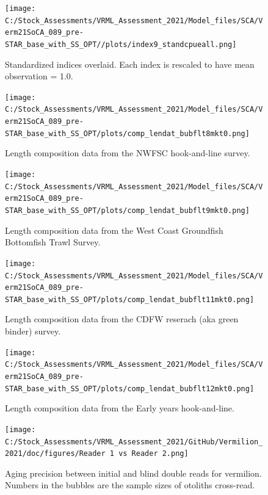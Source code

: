 \documentclass[11pt,
  english,
  a4paper,
]{article}
\begin{document}
\begin{figure}
\centering
\texttt{[image: C:/Stock\_Assessments/VRML\_Assessment\_2021/Model\_files/SCA/Verm21SoCA\_089\_pre-STAR\_base\_with\_SS\_OPT//plots/index9\_standcpueall.png]}
\caption{Standardized indices overlaid. Each index is rescaled to have mean observation = 1.0.\label{fig:cpueall}}
\end{figure}

\begin{figure}
\centering
\texttt{[image: C:/Stock\_Assessments/VRML\_Assessment\_2021/Model\_files/SCA/Verm21SoCA\_089\_pre-STAR\_base\_with\_SS\_OPT/plots/comp\_lendat\_bubflt8mkt0.png]}
\caption{Length composition data from the NWFSC hook-and-line survey.\label{fig:len-data-NWFSC-HKL}}
\end{figure}

\begin{figure}
\centering
\texttt{[image: C:/Stock\_Assessments/VRML\_Assessment\_2021/Model\_files/SCA/Verm21SoCA\_089\_pre-STAR\_base\_with\_SS\_OPT/plots/comp\_lendat\_bubflt9mkt0.png]}
\caption{Length composition data from the West Coast Groundfish Bottomfish Trawl Survey.\label{fig:len-data-NWFSC-TWL}}
\end{figure}

\begin{figure}
\centering
\texttt{[image: C:/Stock\_Assessments/VRML\_Assessment\_2021/Model\_files/SCA/Verm21SoCA\_089\_pre-STAR\_base\_with\_SS\_OPT/plots/comp\_lendat\_bubflt11mkt0.png]}
\caption{Length composition data from the CDFW reserach (aka green binder) survey.\label{fig:len-data-CDFW-RESEARCH}}
\end{figure}

\begin{figure}
\centering
\texttt{[image: C:/Stock\_Assessments/VRML\_Assessment\_2021/Model\_files/SCA/Verm21SoCA\_089\_pre-STAR\_base\_with\_SS\_OPT/plots/comp\_lendat\_bubflt12mkt0.png]}
\caption{Length composition data from the Early years hook-and-line.\label{fig:len-data-EARLY-HKL}}
\end{figure}

\begin{figure}
\centering
\texttt{[image: C:/Stock\_Assessments/VRML\_Assessment\_2021/GitHub/Vermilion\_2021/doc/figures/Reader 1 vs Reader 2.png]}
\caption{Aging precision between initial and blind double reads for vermilion. Numbers in the bubbles are the sample sizes of otoliths cross-read.\label{fig:reader1reader2}}
\end{figure}
\end{document}
